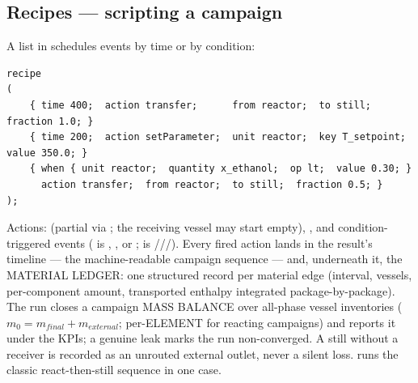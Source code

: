 \documentclass[11pt,a4paper]{article}
\begin{document}
\subsection{Recipes --- scripting a campaign}

A  list in  schedules events by
time or by condition:

\begin{lstlisting}[language=dict]
recipe
(
    { time 400;  action transfer;      from reactor;  to still;  fraction 1.0; }
    { time 200;  action setParameter;  unit reactor;  key T_setpoint;  value 350.0; }
    { when { unit reactor;  quantity x_ethanol;  op lt;  value 0.30; }
      action transfer;  from reactor;  to still;  fraction 0.5; }
);
\end{lstlisting}

Actions:  (partial via ; the receiving
vessel may start empty), , and condition-triggered
 events ( is , ,
 or ;  is
///).  Every fired action lands in
the result's timeline --- the machine-readable campaign sequence ---
and, underneath it, the MATERIAL LEDGER: one structured record per
material edge (interval, vessels, per-component amount, transported
enthalpy integrated package-by-package).  The run closes a campaign
MASS BALANCE over all-phase vessel inventories ($m_0 = m_{final} +
m_{external}$; per-ELEMENT for reacting campaigns) and reports it under
the  KPIs; a genuine leak marks the run non-converged.
A still without a  receiver is recorded as an
unrouted external outlet, never a silent loss.
 runs the classic react-then-still
sequence in one case.
\end{document}
